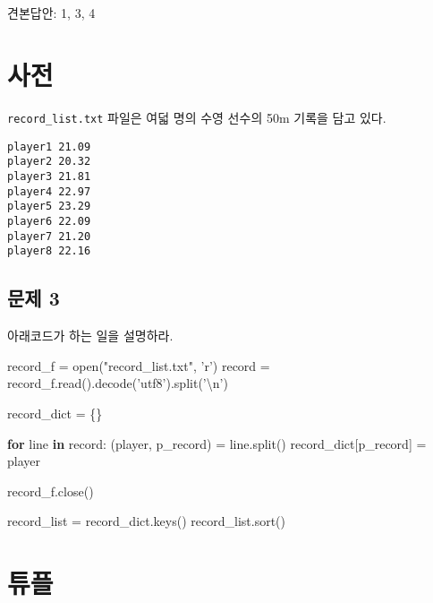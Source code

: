 \documentclass[11pt]{article}
\newenvironment{Shaded}{}{}
\newcommand{\KeywordTok}[1]{\textcolor[rgb]{0.00,0.44,0.13}{\textbf{{#1}}}}
\newcommand{\CharTok}[1]{\textcolor[rgb]{0.25,0.44,0.63}{{#1}}}
\newcommand{\StringTok}[1]{\textcolor[rgb]{0.25,0.44,0.63}{{#1}}}
\newcommand{\NormalTok}[1]{{#1}}
\newcommand{\ControlFlowTok}[1]{\textcolor[rgb]{0.00,0.44,0.13}{\textbf{{#1}}}}
\newcommand{\OperatorTok}[1]{\textcolor[rgb]{0.40,0.40,0.40}{{#1}}}
\newcommand{\BuiltInTok}[1]{{#1}}
\begin{document}
\begin{verbatim}



\end{verbatim}

    견본답안: 1, 3, 4
\fi

\section*{사전}\label{uxc0acuxc804}

\texttt{record\_list.txt} 파일은 여덟 명의 수영 선수의 50m 기록을 담고
있다.

\begin{verbatim}
player1 21.09
player2 20.32
player3 21.81
player4 22.97
player5 23.29
player6 22.09
player7 21.20
player8 22.16
\end{verbatim}

\subsection*{문제 3}\label{uxbb38uxc81c}

아래코드가 하는 일을 설명하라.

\begin{Shaded}
\begin{Highlighting}[]
\NormalTok{record_f }\OperatorTok{=} \BuiltInTok{open}\NormalTok{(}\StringTok{"record_list.txt"}\NormalTok{, }\StringTok{'r'}\NormalTok{)}
\NormalTok{record }\OperatorTok{=}\NormalTok{ record_f.read().decode(}\StringTok{'utf8'}\NormalTok{).split(}\StringTok{'}\CharTok{\textbackslash{}n}\StringTok{'}\NormalTok{)}

\NormalTok{record_dict }\OperatorTok{=}\NormalTok{ \{\}}

\ControlFlowTok{for}\NormalTok{ line }\KeywordTok{in}\NormalTok{ record:}
\NormalTok{    (player, p_record) }\OperatorTok{=}\NormalTok{ line.split()}
\NormalTok{    record_dict[p_record] }\OperatorTok{=}\NormalTok{ player}

\NormalTok{record_f.close()}

\NormalTok{record_list }\OperatorTok{=}\NormalTok{ record_dict.keys()}
\NormalTok{record_list.sort()}

\end{Highlighting}
\end{Shaded}


\section*{튜플}\label{uxd29cuxd50c}
\end{document}
